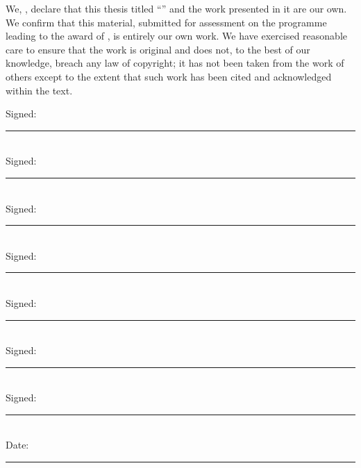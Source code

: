 \documentclass[11pt, a4paper, twoside, openright]{book}
\begin{document}
\begin{declaration}
    \addchaptertocentry{\authorshipname}

    \noindent We, \authorname, declare that this thesis titled
    \enquote{\ttitle} and the work presented in it are our own.
    We confirm that this material, submitted for assessment on the programme
    leading to the award of \degreename, is entirely our own work.
    We have exercised reasonable care to ensure that the work is original and
    does not, to the best of our knowledge, breach any law of copyright; it has
    not been taken from the work of others except to the extent that such work
    has been cited and acknowledged within the text.

    \vspace{2em}

    \noindent Signed:\\ \rule[0.5em]{25em}{0.5pt}\\[0.3em]
    \noindent Signed:\\ \rule[0.5em]{25em}{0.5pt}\\[0.3em]
    \noindent Signed:\\ \rule[0.5em]{25em}{0.5pt}\\[0.3em]
    \noindent Signed:\\ \rule[0.5em]{25em}{0.5pt}\\[0.3em]
    \noindent Signed:\\ \rule[0.5em]{25em}{0.5pt}\\[0.3em]
    \noindent Signed:\\ \rule[0.5em]{25em}{0.5pt}\\[0.3em]
    \noindent Signed:\\ \rule[0.5em]{25em}{0.5pt}\\[0.6em]
    \noindent Date:\\  \rule[0.5em]{25em}{0.5pt}

\end{declaration}
\end{document}
